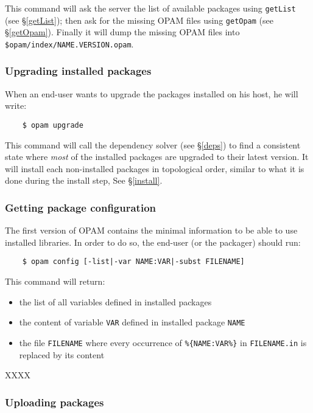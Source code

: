 \documentclass[a4paper,11pt]{article}
\begin{document}
\begin{itemize}
This command will ask the server the list of available packages using
{\tt getList} (see \S\ref{getList}); then ask for the missing OPAM
files using {\tt getOpam} (see \S\ref{getOpam}). Finally it will dump
the missing OPAM files into {\tt \$opam/index/NAME.VERSION.opam}.

\subsubsection{Upgrading installed packages}

When an end-user wants to upgrade the packages installed on his host,
he will write:

\begin{verbatim}
    $ opam upgrade
\end{verbatim}

This command will call the dependency solver (see \S\ref{deps}) to
find a consistent state where {\em most} of the installed packages are
upgraded to their latest version. It will install each non-installed
packages in topological order, similar to what it is done during the
install step, See \S\ref{install}.

\subsubsection{Getting package configuration}

The first version of OPAM contains the minimal information to be able
to use installed libraries. In order to do so, the end-user (or the
packager) should run:

\begin{verbatim}
    $ opam config [-list|-var NAME:VAR|-subst FILENAME]
\end{verbatim}

This command will return:

\begin{itemize}
\item the list of all variables defined in installed packages
\item the content of variable {\tt VAR} defined in installed package
  {\tt NAME}
\item the file {\tt FILENAME} where every occurrence of
  \verb+%{NAME:VAR%}+ in {\tt FILENAME.in} is replaced by its content
\end{itemize}

XXXX


\subsubsection{Uploading packages}
\label{upload}


\end{itemize}
\end{document}
